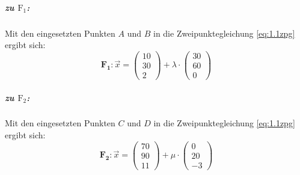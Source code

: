 \documentclass{ajc}
\numberwithin{equation}{subsection}
\begin{document}
	\subparagraph{zu $\text{F}_1$:} Mit den eingesetzten Punkten $A$ und $B$ in die Zweipunktegleichung \ref{eq:1.1zpg} ergibt sich: 
	\begin{equation}
		\mathbf{F_1}: \overrightarrow{x}=\left(\begin{array}{r} 10 \\ 30 \\ 2\end{array}\right) + \lambda \cdot \left(\begin{array}{r} 30 \\ 60 \\ 0\end{array}\right)
	\end{equation}
	
	\subparagraph{zu $\text{F}_2$:} Mit den eingesetzten Punkten $C$ und $D$ in die Zweipunktegleichung \ref{eq:1.1zpg} ergibt sich: 
	\begin{equation}
		\mathbf{F_2}: \overrightarrow{x}=\left(\begin{array}{r} 70 \\ 90 \\ 11\end{array}\right) + \mu \cdot \left(\begin{array}{r} 0 \\ 20 \\ -3\end{array}\right)
	\end{equation}
	
\end{document}
